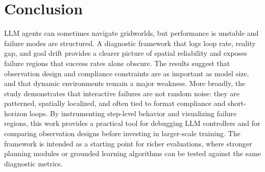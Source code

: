\documentclass[conference]{IEEEtran}
\begin{document}
\section{Conclusion}
LLM agents can sometimes navigate gridworlds, but performance is unstable and failure modes are structured. A diagnostic framework that logs loop rate, reality gap, and goal drift provides a clearer picture of spatial reliability and exposes failure regions that success rates alone obscure. The results suggest that observation design and compliance constraints are as important as model size, and that dynamic environments remain a major weakness.
More broadly, the study demonstrates that interactive failures are not random noise: they are patterned, spatially localized, and often tied to format compliance and short-horizon loops. By instrumenting step-level behavior and visualizing failure regions, this work provides a practical tool for debugging LLM controllers and for comparing observation designs before investing in larger-scale training. The framework is intended as a starting point for richer evaluations, where stronger planning modules or grounded learning algorithms can be tested against the same diagnostic metrics.


\end{document}
